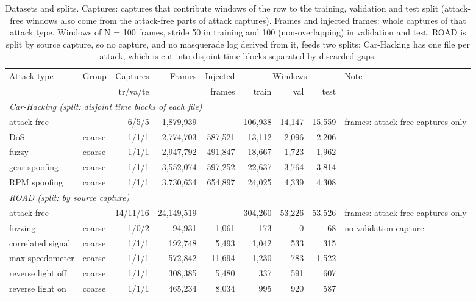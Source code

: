 \begin{table}[t]
\centering
\footnotesize
\caption{Datasets and splits. Captures: captures that contribute windows of the row to the training, validation and test split (attack-free windows also come from the attack-free parts of attack captures). Frames and injected frames: whole captures of that attack type. Windows of N = 100 frames, stride 50 in training and 100 (non-overlapping) in validation and test. ROAD is split by source capture, so no capture, and no masquerade log derived from it, feeds two splits; Car-Hacking has one file per attack, which is cut into disjoint time blocks separated by discarded gaps.}
\label{tab:dataset}
\begin{tabular}{@{}llrrrrrrl@{}}
\toprule
Attack type & Group & Captures & Frames & Injected & \multicolumn{3}{c}{Windows} & Note \\
\cmidrule(lr){6-8}
& & tr/va/te & & frames & train & val & test & \\
\midrule
\multicolumn{9}{l}{\textit{Car-Hacking (split: disjoint time blocks of each file)}} \\
attack-free & -- & 6/5/5 & 1,879,939 & -- & 106,938 & 14,147 & 15,559 & frames: attack-free captures only \\
DoS & coarse & 1/1/1 & 2,774,703 & 587,521 & 13,112 & 2,096 & 2,206 &  \\
fuzzy & coarse & 1/1/1 & 2,947,792 & 491,847 & 18,667 & 1,723 & 1,962 &  \\
gear spoofing & coarse & 1/1/1 & 3,552,074 & 597,252 & 22,637 & 3,764 & 3,814 &  \\
RPM spoofing & coarse & 1/1/1 & 3,730,634 & 654,897 & 24,025 & 4,339 & 4,308 &  \\
\midrule
\multicolumn{9}{l}{\textit{ROAD (split: by source capture)}} \\
attack-free & -- & 14/11/16 & 24,149,519 & -- & 304,260 & 53,226 & 53,526 & frames: attack-free captures only \\
fuzzing & coarse & 1/0/2 & 94,931 & 1,061 & 173 & 0 & 68 & no validation capture \\
correlated signal & coarse & 1/1/1 & 192,748 & 5,493 & 1,042 & 533 & 315 &  \\
max speedometer & coarse & 1/1/1 & 572,842 & 11,694 & 1,230 & 783 & 1,522 &  \\
reverse light off & coarse & 1/1/1 & 308,385 & 5,480 & 337 & 591 & 607 &  \\
reverse light on & coarse & 1/1/1 & 465,234 & 8,034 & 995 & 920 & 587 &  \\

\end{tabular}
\end{table}
